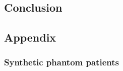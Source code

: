 \subsection{Conclusion}
%

\subsection*{Appendix}

\subsubsection*{Synthetic phantom patients}
%
%	

